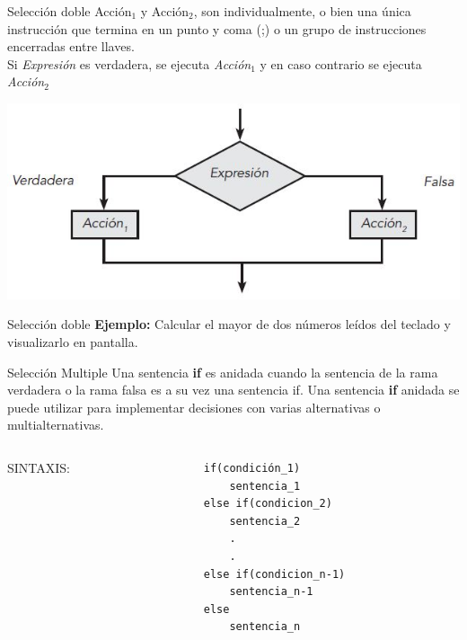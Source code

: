 \begin{frame}{Selección doble}
Acción$ _{1} $ y Acción$ _{2} $, son individualmente, o bien una única instrucción que termina en
un punto y coma (;) o un grupo de instrucciones encerradas entre llaves.\\
\vspace{2mm}
Si \textit{Expresión} es verdadera, se ejecuta \textit{Acción$ _{1} $} y en caso contrario se ejecuta \textit{Acción$ _{2} $}
\begin{center}
	\includegraphics[width=0.7\linewidth]{figs/flujoSeleccionDoble}
\end{center}
\end{frame}

\begin{frame}[fragile]{Selección doble}
\textbf{Ejemplo:} Calcular el mayor de dos números leídos del teclado y visualizarlo en pantalla.
%

\end{frame}

\begin{frame}[t, fragile]{Selección Multiple}
	Una sentencia \textbf{if} es anidada cuando la sentencia de la rama verdadera o la rama falsa es a su vez una sentencia if. Una sentencia \textbf{if} anidada se puede utilizar para implementar decisiones con varias alternativas o multialternativas.
	\begin{columns}
		\begin{column}{0.40 \textwidth}
		  \centering
			{\LARGE SINTAXIS:}
		\end{column}
		\begin{column}{0.40 \textwidth}
            \vspace{1.5mm}
			\begin{lstlisting}
if(condición_1)
    sentencia_1
else if(condicion_2)
    sentencia_2
    .
    .
else if(condicion_n-1)
    sentencia_n-1
else
    sentencia_n
\end{lstlisting}
		\end{column}	
	\end{columns}
\end{frame}

